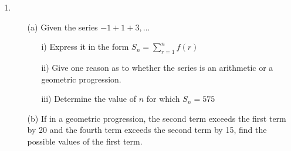 \begin{enumerate}
	\item
	\begin{enumerate}[topsep=0ex,itemsep=0ex,partopsep=1ex,parsep=1ex]
		\item[(a)] Given the series $-1 + 1 + 3, ...$
		\begin{enumerate}[topsep=0ex,itemsep=0ex,partopsep=1ex,parsep=1ex]
			\item[i)] Express it in the form $S_n = \sum_{r=1}^n f(r)$
			\item[ii)] Give one reason as to whether the series is an arithmetic or a geometric progression.
			\item[iii)] Determine the value of $n$ for which $S_n = 575$
		\end{enumerate}
		
		\item[(b)] If in a geometric progression, the second term exceeds the first term by 20 and the fourth term exceeds the second term by 15, find the possible values of the first term. 
	\end{enumerate}
\end{enumerate}










